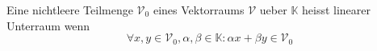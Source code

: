 Eine nichtleere Teilmenge $\mathcal{V}_0$ eines Vektorraums $\mathcal{V}$ ueber $\mathbb{K}$ heisst linearer Unterraum wenn
$$\forall x,y \in \mathcal{V}_0, \alpha, \beta \in \mathbb{K} : \alpha x + \beta y \in \mathcal{V}_0$$ 
